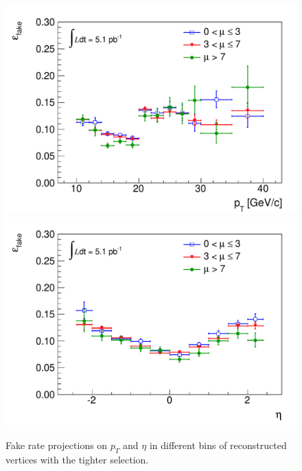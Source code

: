 \begin{figure}[!htbp]
\begin{center}
\includegraphics[scale=0.5]{figures/frpt_pu.pdf}
\includegraphics[scale=0.5]{figures/freta_pu.pdf}
\caption{Fake rate projections on $p_T$ and $\eta$ in different bins of reconstructed vertices with the tighter selection.}
\label{fig:mufakerate1}
\end{center}
\end{figure}
